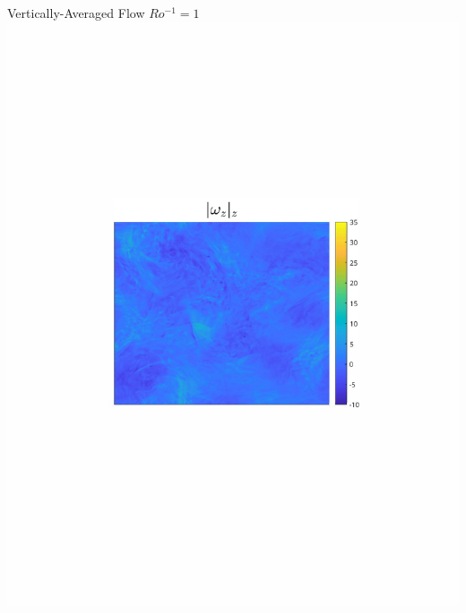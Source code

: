 \documentclass{beamer}
\begin{document}
\begin{frame}{Vertically-Averaged Flow}
    \centering
        {\footnotesize $Ro^{-1} = 1$}
    \emp
        \centering
        \includegraphics[width=1\textwidth]{images/Om1B30_vortz_bar.pdf}
    \emp
        \centering

\end{frame}
\end{document}
